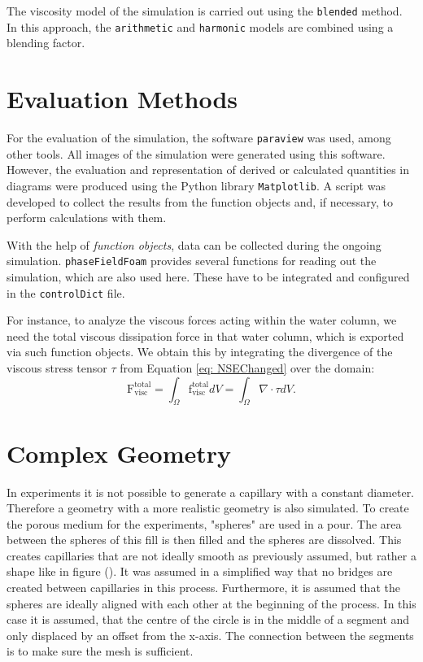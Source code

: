 The viscosity model of the simulation is carried out using the \verb|blended| method. In this approach, the \verb|arithmetic| and \verb|harmonic| models are combined using a blending factor.


\section{Evaluation Methods}
For the evaluation of the simulation, the software \verb|paraview| was used, among other tools. All images of the simulation were generated using this software. However, the evaluation and representation of derived or calculated quantities in diagrams were produced using the Python library \verb|Matplotlib|. A script was developed to collect the results from the function objects and, if necessary, to perform calculations with them.

With the help of \textit{function objects}, data can be collected during the ongoing simulation. \verb|phaseFieldFoam| provides several functions for reading out the simulation, which are also used here. These have to be integrated and configured in the \verb|controlDict| file.

For instance, to analyze the viscous forces acting within the water column, we need the total viscous dissipation force in that water column, which is exported via such function objects. We obtain this by integrating the divergence of the viscous stress tensor $\tau$ from Equation \ref{eq: NSEChanged} over the domain:
\begin{equation}
    \mathrm{F}_{\mathrm{visc}}^{\mathrm{total}} = \int_{\Omega} \mathrm{f}_{\mathrm{visc}}^{\mathrm{total}} dV = \int_{\Omega} \nabla \cdot \tau dV.
\end{equation}

\section{Complex Geometry}
In experiments it is not possible to generate a capillary with a constant diameter. Therefore a geometry with a more realistic geometry is also simulated. To create the porous medium for the experiments, "spheres" are used in a pour. The area between the spheres of this fill is then filled and the spheres are dissolved. This creates capillaries that are not ideally smooth as previously assumed, but rather a shape like in figure (). It was assumed in a simplified way that no bridges are created between capillaries in this process. Furthermore, it is assumed that the spheres are ideally aligned with each other at the beginning of the process.   
In this case it is assumed, that the centre of the circle is in the middle of a segment and only displaced by an offset from the x-axis. The connection between the segments is to make sure the mesh is sufficient. 

